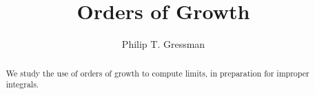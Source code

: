 \documentclass{ximera}
\title{Orders of Growth}
\author{Philip T. Gressman}
\begin{document}
\begin{abstract}
We study the use of orders of growth to compute limits, in preparation for improper integrals.
\end{abstract}
\maketitle

\begin{example}

\end{example}

\begin{example}

\end{example}
\end{document}
